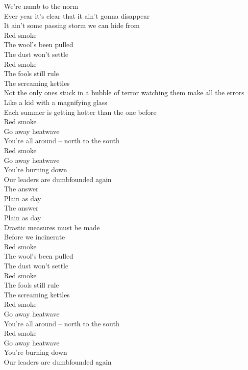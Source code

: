 We're numb to the norm \\
Ever year it's clear that it ain't gonna disappear \\
It ain't some passing storm we can hide from \\

Red smoke \\
The wool's been pulled \\
The dust won't settle \\
Red smoke \\
The fools still rule \\
The screaming kettles \\

Not the only ones stuck in a bubble of terror watching them make all the errors \\
Like a kid with a magnifying glass \\
Each summer is getting hotter than the one before \\

Red smoke \\
Go away heatwave \\
You're all around -- north to the south \\
Red smoke \\
Go away heatwave \\
You're burning down \\
Our leaders are dumbfounded again \\

The answer \\
Plain as day \\
The answer \\
Plain as day \\
Drastic measures must be made \\
Before we incinerate \\

Red smoke \\
The wool's been pulled \\
The dust won't settle \\
Red smoke \\
The fools still rule \\
The screaming kettles \\
Red smoke \\
Go away heatwave \\
You're all around -- north to the south \\
Red smoke \\
Go away heatwave \\
You're burning down \\
Our leaders are dumbfounded again \\

